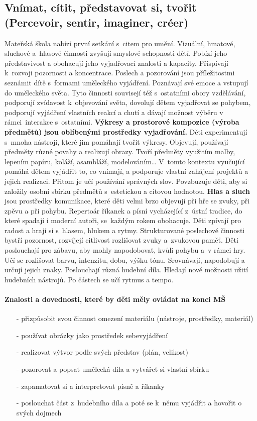 		\subsection{Vnímat, cítit, představovat si, tvořit (Percevoir, sentir, imaginer, créer)}
			Mateřská škola nabízí první setkání s citem pro umění. Vizuální, hmatové, sluchové a hlasové činnosti zvyšují smyslové schopnosti dětí. Pobízí jeho představivost a obohacují jeho vyjadřovací znalosti a kapacity. Přispívají k rozvoji pozornosti a koncentrace. Poslech a pozorování jsou příležitostmi seznámit dítě s formami uměleckého vyjádření. Poznávají své emoce a vstupují do uměleckého světa.
			Tyto činnosti souvisejí též s ostatními obory vzdělávání, podporují zvídavost k objevování světa, dovolují dětem vyjadřovat se pohybem, podporují vyjádření vlastních reakcí a chutí a dávají možnost výběru v rámci interakce s ostatními.
			\textbf{Výkresy a prostorové kompozice (výroba předmětů) jsou oblíbenými prostředky vyjadřování.}
			Děti experimentují s mnoha nástroji, které jim pomáhají tvořit výkresy. Objevují, používají předměty různé povahy a realizují obrazy. Tvoří předměty využitím malby, lepením papíru, koláží, asambláží, modelováním…
			V tomto kontextu vyučující pomáhá dětem vyjádřit to, co vnímají, a podporuje vlastní zahájení projektů a jejich realizaci. Přitom je učí používání správných slov. Povzbuzuje děti, aby si založily osobní sbírku předmětů s estetickou a citovou hodnotou.
			\textbf{Hlas a sluch} jsou prostředky komunikace, které děti velmi brzo objevují při hře se zvuky, při zpěvu a při pohybu.
			Repertoár říkanek a písní vycházející z ústní tradice, do které spadají i moderní autoři, se každým rokem obohacuje. Děti zpívají pro radost a hrají si s hlasem, hlukem a rytmy.
			Strukturované poslechové činnosti bystří pozornost, rozvíjejí citlivost rozlišovat zvuky a zvukovou paměť. Děti poslouchají pro zábavu, aby mohly napodobovat, kvůli pohybu a v rámci hry. Učí se rozlišovat barvu, intenzitu, dobu, výšku tónu. Srovnávají, napodobují a určují jejich znaky. Poslouchají různá hudební díla. Hledají nové možnosti užití hudebních nástrojů. Po částech se učí rytmus a tempo. 

			\paragraph{Znalosti a dovednosti, které by děti měly ovládat na konci MŠ}
				\begin{itemize}
					\setlength\itemsep{-2mm}
					\item[-] přizpůsobit svou činnost omezení materiálu (nástroje, prostředky, materiál)
					\item[-] používat obrázky jako prostředek sebevyjádření
					\item[-] realizovat výtvor podle svých představ (plán, velikost)
					\item[-] pozorovat a popsat umělecká díla a vytvářet si vlastní sbírku
					\item[-] zapamatovat si a interpretovat písně a říkanky
					\item[-] poslouchat část z hudebního díla a poté se k němu vyjádřit a hovořit o svých dojmech
				\end{itemize}



